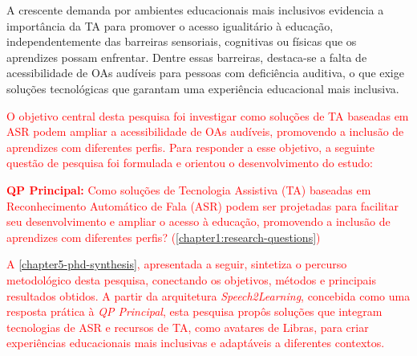A crescente demanda por ambientes educacionais mais inclusivos evidencia a importância da TA para promover o acesso igualitário à educação, independentemente das barreiras sensoriais, cognitivas ou físicas que os aprendizes possam enfrentar. Dentre essas barreiras, destaca-se a falta de acessibilidade de OAs audíveis para pessoas com deficiência auditiva, o que exige soluções tecnológicas que garantam uma experiência educacional mais inclusiva.

\textcolor{red}{O objetivo central desta pesquisa foi investigar como soluções de TA baseadas em ASR podem ampliar a acessibilidade de OAs audíveis, promovendo a inclusão de aprendizes com diferentes perfis. Para responder a esse objetivo, a seguinte questão de pesquisa foi formulada e orientou o desenvolvimento do estudo:}

\begin{citacao}
\textcolor{red}{\textbf{QP Principal:} Como soluções de Tecnologia Assistiva (TA) baseadas em Reconhecimento Automático de Fala (ASR) podem ser projetadas para facilitar seu desenvolvimento e ampliar o acesso à educação, promovendo a inclusão de aprendizes com diferentes perfis? (\autoref{chapter1:research-questions})}
\end{citacao}

\textcolor{red}{A \autoref{chapter5-phd-synthesis}, apresentada a seguir, sintetiza o percurso metodológico desta pesquisa, conectando os objetivos, métodos e principais resultados obtidos. A partir da arquitetura \textit{Speech2Learning}, concebida como uma resposta prática à \textit{QP Principal}, esta pesquisa propôs soluções que integram tecnologias de ASR e recursos de TA, como avatares de Libras, para criar experiências educacionais mais inclusivas e adaptáveis a diferentes contextos.}

